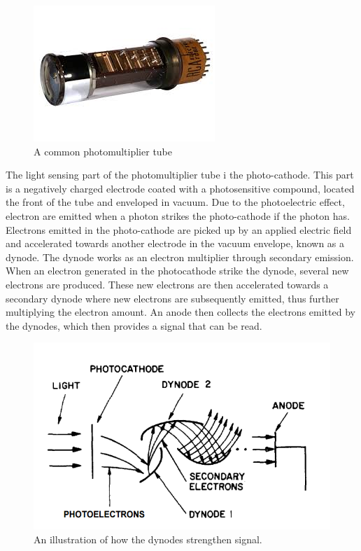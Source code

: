 \begin{figure}[htb]
\begin{center}
\includegraphics[scale=0.6]{figures/RCS/photomultiplier_tube}
\caption{A common photomultiplier tube}
\label{fig:PMT}
\end{center}
\end{figure}

The light sensing part of the photomultiplier tube i the photo-cathode. This part is a negatively charged electrode coated with a photosensitive compound, located  the front of the tube and enveloped in vacuum. Due to the photoelectric effect, electron are emitted when a photon strikes the photo-cathode if the photon has. Electrons emitted in the photo-cathode are picked up by an applied electric field and accelerated towards another electrode in the vacuum envelope, known as a dynode. The dynode works as an electron multiplier through secondary emission. When an electron generated in the photocathode strike the dynode, several new electrons are produced. These new electrons are then accelerated towards a secondary dynode where new electrons are subsequently emitted, thus further multiplying the electron amount. An anode then collects the electrons emitted by the dynodes, which then provides a signal that can be read.

\begin{figure}[htb]
\begin{center}
\includegraphics[scale=0.6]{figures/RCS/PMT}
\caption{An illustration of how the dynodes strengthen signal.}
\label{fig:PMT_dynode}
\end{center}
\end{figure}

